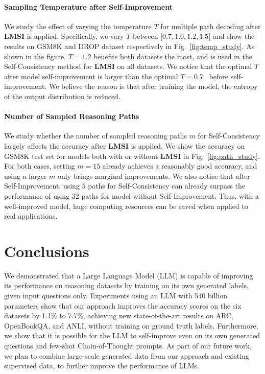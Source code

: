 \documentclass{article} %
\newcommand{\method}{\textbf{LMSI}\xspace}
\begin{document}
\paragraph{Sampling Temperature after Self-Improvement}
We study the effect of varying the temperature $T$ for multiple path decoding after \method is applied. Specifically, we vary $T$ between [$0.7, 1.0, 1.2, 1.5$] and show the results on GSM8K and DROP dataset respectively in Fig.~\ref{fig:temp_study}. As shown in the figure, $T=1.2$ benefits both datasets the most, and is used in the Self-Consistency method for \method on all datasets. We notice that the optimal $T$ after model self-improvement is larger than the optimal $T=0.7$~\citep{Wang2022SelfConsistencyIC} before self-improvement. We believe the reason is that after training the model, the entropy of the output distribution is reduced.

\paragraph{Number of Sampled Reasoning Paths}
We study whether the number of sampled reasoning paths $m$ for Self-Consistency largely affects the accuracy after \method is applied. We show the accuracy on GSM8K test set for models both with or without \method in Fig.~\ref{fig:path_study}. For both cases, setting $m=15$ already achieves a reasonably good accuracy, and using a larger $m$ only brings marginal improvements. We also notice that after Self-Improvement, using $5$ paths for Self-Consistency can already surpass the performance of using $32$ paths for model without Self-Improvement. Thus, with a well-improved model, huge computing resources can be saved when applied to real applications.





\section{Conclusions}
\label{sec:conclusions}

We demonstrated that a Large Language Model (LLM) is capable of improving its performance on reasoning datasets by training on its own generated labels, given input questions only. Experiments using an LLM with 540 billion parameters show that our approach improves the accuracy scores on the six datasets by 1.1\% to 7.7\%, achieving new state-of-the-art results on ARC, OpenBookQA, and ANLI, without training on ground truth labels. Furthermore, we show that it is possible for the LLM to self-improve even on its own generated questions and few-shot Chain-of-Thought prompts. As part of our future work, we plan to combine large-scale generated data from our approach and existing supervised data, to further improve the performance of LLMs.
\end{document}
